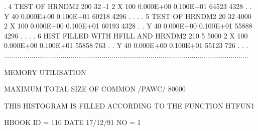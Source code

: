 \begin{Listing}
 .   4  TEST OF HRNDM2                               200  32       -1  2  X   100   0.000E+00   0.100E+01       64523   4328 .
 .                                                                        Y    40   0.000E+00   0.100E+01       60218   4296 .
 .                                                                                                                           .
 .   5  TEST OF HRNDM2                                20  32     4000  2  X   100   0.000E+00   0.100E+01       60193   4328 .
 .                                                                        Y    40   0.000E+00   0.100E+01       55888   4296 .
 .                                                                                                                           .
 .   6  HIST FILLED WITH HFILL AND HRNDM2            210   5     5000  2  X   100   0.000E+00   0.100E+01       55858    763 .
 .                                                                        Y    40   0.000E+00   0.100E+01       55123    726 .
 .                                                                                                                           .
 .............................................................................................................................

 MEMORY UTILISATION

      MAXIMUM TOTAL SIZE OF COMMON /PAWC/            80000
 
 THIS HISTOGRAM IS FILLED ACCORDING TO THE FUNCTION HTFUN1                       
 
 HBOOK     ID =       110                                        DATE  17/12/91              NO =   1
 

\end{Listing}
